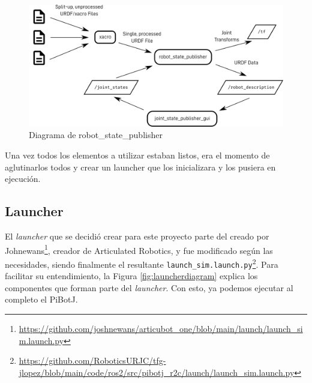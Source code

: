  \begin{figure} [h!]
	\begin{center}
		\includegraphics[width=12cm]{figs/cap6/rsp.png}
	\end{center}
	\caption{Diagrama de robot\_state\_publisher}
	\label{fig:rsp}
\end{figure}

Una vez todos los elementos a utilizar estaban listos, era el momento de aglutinarlos todos y crear un launcher que los inicializara y los pusiera en ejecución.

\subsection{Launcher}
\label{subsec:launcher}

El \textit{launcher} que se decidió crear para este proyecto parte del creado por Johnewans\footnote{\url{https://github.com/joshnewans/articubot_one/blob/main/launch/launch_sim.launch.py}}, creador de Articulated Robotics, y fue modificado según las necesidades, siendo finalmente el resultante \verb|launch_sim.launch.py|\footnote{\url{https://github.com/RoboticsURJC/tfg-jlopez/blob/main/code/ros2/src/pibotj_r2c/launch/launch_sim.launch.py}}. Para facilitar su entendimiento, la Figura \ref{fig:launcherdiagram} explica los componentes que forman parte del \textit{launcher}. Con esto, ya podemos ejecutar al completo el PiBotJ.


